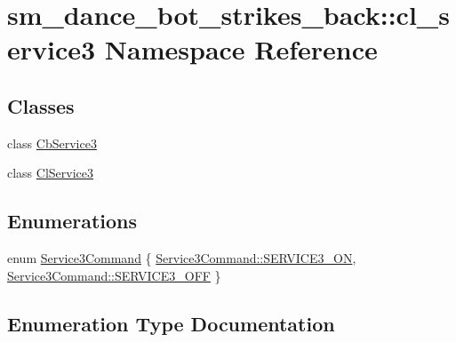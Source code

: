 \hypertarget{namespacesm__dance__bot__strikes__back_1_1cl__service3}{}\section{sm\+\_\+dance\+\_\+bot\+\_\+strikes\+\_\+back\+:\+:cl\+\_\+service3 Namespace Reference}
\label{namespacesm__dance__bot__strikes__back_1_1cl__service3}
\subsection*{Classes}
\begin{DoxyCompactItemize}
\item 
class \hyperlink{classsm__dance__bot__strikes__back_1_1cl__service3_1_1CbService3}{Cb\+Service3}
\item 
class \hyperlink{classsm__dance__bot__strikes__back_1_1cl__service3_1_1ClService3}{Cl\+Service3}
\end{DoxyCompactItemize}
\subsection*{Enumerations}
\begin{DoxyCompactItemize}
\item 
enum \hyperlink{namespacesm__dance__bot__strikes__back_1_1cl__service3_ac2ccf5d911840620cf8d0443c29d8b6b}{Service3\+Command} \{ \hyperlink{namespacesm__dance__bot__strikes__back_1_1cl__service3_ac2ccf5d911840620cf8d0443c29d8b6ba13cdca48a01bbb44fa8fb35567fbc58e}{Service3\+Command\+::\+S\+E\+R\+V\+I\+C\+E3\+\_\+\+ON}, 
\hyperlink{namespacesm__dance__bot__strikes__back_1_1cl__service3_ac2ccf5d911840620cf8d0443c29d8b6ba642ed22a7f6b816840289b4256116e9e}{Service3\+Command\+::\+S\+E\+R\+V\+I\+C\+E3\+\_\+\+O\+FF}
 \}
\end{DoxyCompactItemize}


\subsection{Enumeration Type Documentation}
